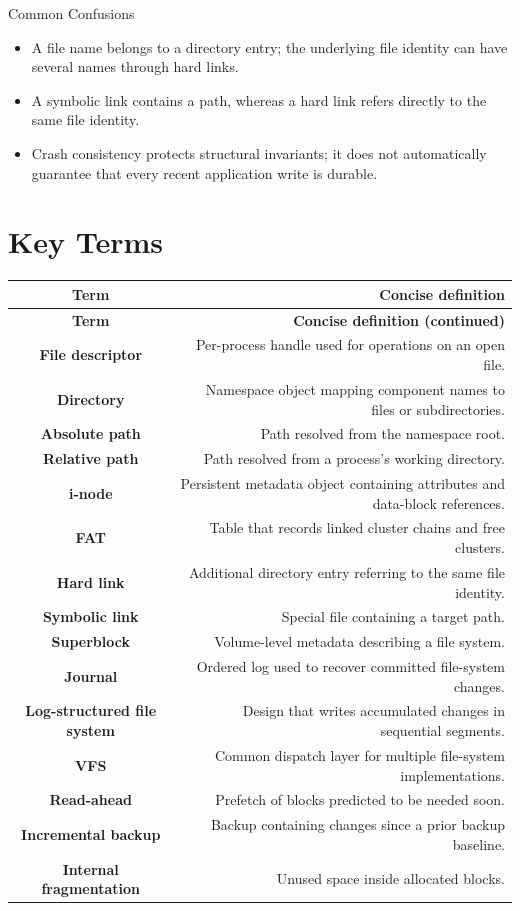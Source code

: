 \documentclass[10pt,letterpaper]{article}
\begin{document}
\begin{studybox}{Common Confusions}
\begin{itemize}
  \item A file name belongs to a directory entry; the underlying file identity can have several names through hard links.
  \item A symbolic link contains a path, whereas a hard link refers directly to the same file identity.
  \item Crash consistency protects structural invariants; it does not automatically guarantee that every recent application write is durable.
\end{itemize}
\end{studybox}

\section*{Key Terms}
\small
\begin{longtable}{C N}
\color{white}\textbf{Term} & \color{white}\textbf{Concise definition}\\
\endfirsthead
{}\color{white}\textbf{Term} & \color{white}\textbf{Concise definition (continued)}\\
\endhead
\textbf{File descriptor} & Per-process handle used for operations on an open file.\\\hline
\textbf{Directory} & Namespace object mapping component names to files or subdirectories.\\\hline
\textbf{Absolute path} & Path resolved from the namespace root.\\\hline
\textbf{Relative path} & Path resolved from a process's working directory.\\\hline
\textbf{i-node} & Persistent metadata object containing attributes and data-block references.\\\hline
\textbf{FAT} & Table that records linked cluster chains and free clusters.\\\hline
\textbf{Hard link} & Additional directory entry referring to the same file identity.\\\hline
\textbf{Symbolic link} & Special file containing a target path.\\\hline
\textbf{Superblock} & Volume-level metadata describing a file system.\\\hline
\textbf{Journal} & Ordered log used to recover committed file-system changes.\\\hline
\textbf{Log-structured file system} & Design that writes accumulated changes in sequential segments.\\\hline
\textbf{VFS} & Common dispatch layer for multiple file-system implementations.\\\hline
\textbf{Read-ahead} & Prefetch of blocks predicted to be needed soon.\\\hline
\textbf{Incremental backup} & Backup containing changes since a prior backup baseline.\\\hline
\textbf{Internal fragmentation} & Unused space inside allocated blocks.\\\hline
\end{longtable}
\normalsize
\end{document}
